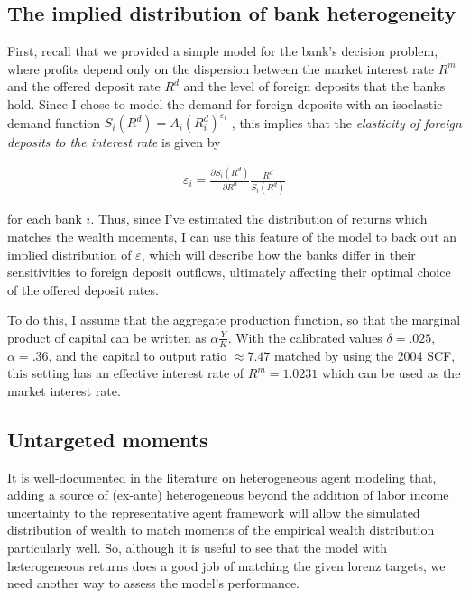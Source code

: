   \subsection{The implied distribution of bank heterogeneity}

  \par First, recall that we provided a simple model for the bank's decision problem, where profits depend only on the dispersion between the market interest rate $R^m$ and the offered deposit rate $R^d$ and the level of foreign deposits that the banks hold. Since I chose to model the demand for foreign deposits with an isoelastic demand function $S_i(R^d) = A_i (R_i^d)^{\varepsilon_i}$ , this implies that the \textit{elasticity of foreign deposits to the interest rate} is given by

  \begin{align}
    \varepsilon_i = \frac{\partial S_i(R^d)}{\partial R^d} \frac{R^d}{S_i(R^d)}
  \end{align}

  for each bank $i$. Thus, since I've estimated the distribution of returns which matches the wealth moements, I can use this feature of the model to back out an implied distribution of $\varepsilon$, which will describe how the banks differ in their sensitivities to foreign deposit outflows, ultimately affecting their optimal choice of the offered deposit rates. 

  \par To do this, I assume that the aggregate production function,  so that the marginal product of capital can be written as $\alpha \frac{Y}{K}$. With the calibrated values  $\delta = .025$, $\alpha = .36$, and the capital to output ratio $\approx 7.47$  matched by using the 2004 SCF, this setting has an effective interest rate of $R^m = 1.0231$ which can be used as the market interest rate.
 

\subsection{Untargeted moments}

\par It is well-documented in the literature on heterogeneous agent modeling that, adding a source of (ex-ante) heterogeneous beyond the addition of labor income uncertainty to the representative agent framework will allow the simulated distribution of wealth to match moments of the empirical wealth distribution particularly well. So, although it is useful to see that the model with heterogeneous returns does a good job of matching the given lorenz targets, we need another way to assess the model's performance.

